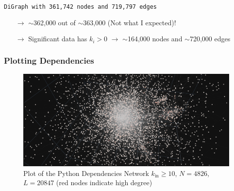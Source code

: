 \documentclass[fleqn]{beamer}
\begin{document}
    \begin{frame}
        \centering
        \texttt{DiGraph with 361,742 nodes and 719,797 edges}\\
        \vspace{1cm}
        \begin{itemize}
            \item[$\to$]\centering $\sim$362,000 out of $\sim$363,000  (Not what I expected)!
            \item[$\to$]\centering Significant data has $k_i > 0$ $\to$
                               $\sim$164,000 nodes and $\sim$720,000 edges
        \end{itemize}
    \end{frame}

    \begin{frame}
        \frametitle{Plotting Dependencies}
    \begin{figure}[htpb]
        \centering
        \includegraphics[width=1\textwidth, ]{./pics/req_3d.png}
        \caption{Plot of the Python Dependencies Network $k_{\text{in}}\ge
            10$, $N=4826$, $L=20847$
            (red nodes indicate high degree)}
    \end{figure}
    \end{frame}
\end{document}

